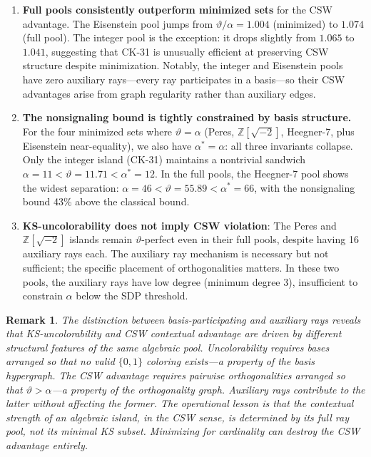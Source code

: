 \documentclass[12pt,a4paper]{article}
\newtheorem{remark}[theorem]{Remark}
\newcommand{\Z}{\mathbb{Z}}
\begin{document}
\begin{enumerate}
    \item \textbf{Full pools consistently outperform minimized sets} for the CSW advantage. The Eisenstein pool jumps from $\vartheta/\alpha = 1.004$ (minimized) to $1.074$ (full pool). The integer pool is the exception: it drops slightly from $1.065$ to $1.041$, suggesting that CK-31 is unusually efficient at preserving CSW structure despite minimization. Notably, the integer and Eisenstein pools have zero auxiliary rays---every ray participates in a basis---so their CSW advantages arise from graph regularity rather than auxiliary edges.

    \item \textbf{The nonsignaling bound is tightly constrained by basis structure.} For the four minimized sets where $\vartheta = \alpha$ (Peres, $\Z[\sqrt{-2}]$, Heegner-7, plus Eisenstein near-equality), we also have $\alpha^* = \alpha$: all three invariants collapse. Only the integer island (CK-31) maintains a nontrivial sandwich $\alpha = 11 < \vartheta = 11.71 < \alpha^* = 12$. In the full pools, the Heegner-7 pool shows the widest separation: $\alpha = 46 < \vartheta = 55.89 < \alpha^* = 66$, with the nonsignaling bound 43\% above the classical bound.

    \item \textbf{KS-uncolorability does not imply CSW violation}: The Peres and $\Z[\sqrt{-2}]$ islands remain $\vartheta$-perfect even in their full pools, despite having 16 auxiliary rays each. The auxiliary ray mechanism is necessary but not sufficient; the specific placement of orthogonalities matters. In these two pools, the auxiliary rays have low degree (minimum degree 3), insufficient to constrain $\alpha$ below the SDP threshold.
\end{enumerate}

\begin{remark}
The distinction between basis-participating and auxiliary rays reveals that KS-uncolorability and CSW contextual advantage are driven by different structural features of the same algebraic pool. Uncolorability requires bases arranged so that no valid $\{0,1\}$ coloring exists---a property of the basis \emph{hypergraph}. The CSW advantage requires pairwise orthogonalities arranged so that $\vartheta > \alpha$---a property of the orthogonality \emph{graph}. Auxiliary rays contribute to the latter without affecting the former. The operational lesson is that the contextual strength of an algebraic island, in the CSW sense, is determined by its full ray pool, not its minimal KS subset. Minimizing for cardinality can destroy the CSW advantage entirely.
\end{remark}
\end{document}
